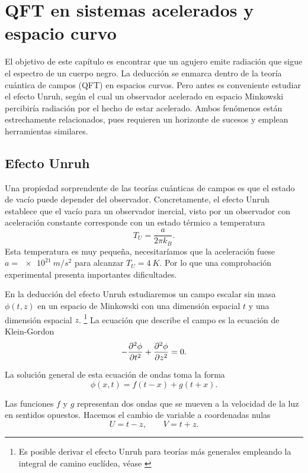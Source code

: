 \chapter{QFT en sistemas acelerados y espacio curvo}
El objetivo de este capítulo es encontrar que un agujero emite radiación que sigue el espectro
de un cuerpo negro.
La deducción se enmarca dentro de la teoría cuántica de campos (QFT) en espacios curvos.
Pero antes es conveniente estudiar el efecto Unruh, según el cual un observador acelerado en 
espacio Minkowski percibiría radiación por el hecho de estar acelerado.
Ambos fenómenos están estrechamente relacionados, pues requieren un horizonte de sucesos y emplean herramientas similares.

\section{Efecto Unruh}

Una propiedad sorprendente de las teorías cuánticas de campos es que el estado de vacío
puede depender del observador.
Concretamente, el efecto Unruh establece que el vacío para un observador inercial,
visto por un observador con aceleración constante corresponde con un estado térmico a temperatura
\begin{equation}
  T_U=\frac{a}{2\pi k_B}.
\end{equation}
Esta temperatura es muy pequeña, necesitaríamos que la aceleración fuese $a=\SI{e21}{m/s^2}$
para alcanzar $T_U=\SI{4}{K}$. 
Por lo que una comprobación experimental presenta importantes dificultades.

En la deducción del efecto Unruh estudiaremos un campo escalar sin masa $\phi(t,z)$ en un espacio de Minkowski
con una dimensión espacial $t$ y una dimensión espacial $z$.  
\footnote{Es posible derivar el efecto Unruh para teorías más generales empleando la integral
  de camino euclídea, véase \cite{Susskind}}
La ecuación que describe el campo es la ecuación de Klein-Gordon
\begin{equation}
  -\pdv[2]{\phi}{t}+\pdv[2]{\phi}{z}=0.
  \label{eq:kg}
\end{equation}

La solución general de esta ecuación de ondas toma la forma
\begin{equation}
  \phi(x,t)=f(t-x)+g(t+x).
\end{equation}

Las funciones $f$ y $g$ representan dos ondas que se mueven a la velocidad de la luz en sentidos
opuestos. 
Hacemos el cambio de variable a coordenadas nulas
\begin{equation}
  U=t-z,   \qquad V=t+z.
\end{equation}

